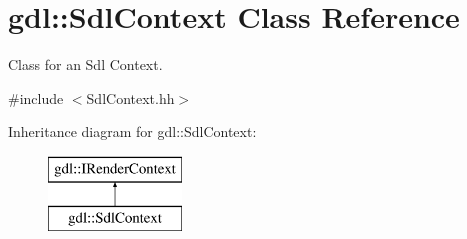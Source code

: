 \hypertarget{classgdl_1_1_sdl_context}{\section{gdl\-:\-:Sdl\-Context Class Reference}
\label{classgdl_1_1_sdl_context}
}


Class for an Sdl Context.  




{\ttfamily \#include $<$Sdl\-Context.\-hh$>$}

Inheritance diagram for gdl\-:\-:Sdl\-Context\-:\begin{figure}[H]
\begin{center}
\leavevmode
\includegraphics[height=2.000000cm]{classgdl_1_1_sdl_context}
\end{center}
\end{figure}
